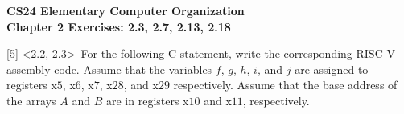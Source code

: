 \documentclass[12pt]{article}
\begin{document}
	\begin{center}
		\textbf{CS24 Elementary Computer Organization} \\
		\textbf{Chapter 2 Exercises: 2.3, 2.7, 2.13, 2.18} \vspace{0.5cm}
	\end{center}
	
	
	
	
	\noindent {} 
	[5] \textless2.2, 2.3\textgreater \ For the following C statement, write the corresponding RISC-V assembly code. Assume that the variables $f$, $g$, $h$, $i$, and $j$ are assigned to registers x$5$, x$6$, x$7$, x$28$, and x$29$ respectively. Assume that the base address of the arrays $A$ and $B$ are in registers x$10$ and x$11$, respectively. \vspace{0.15cm} \\
\end{document}
